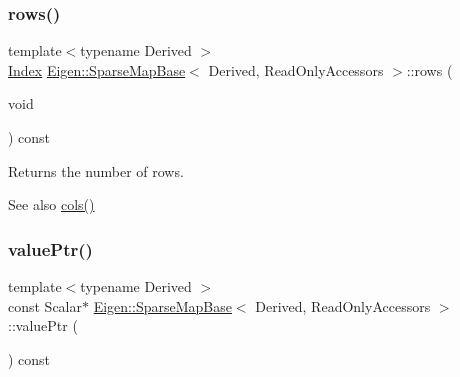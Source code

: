 \subsubsection{\texorpdfstring{rows()}{rows()}}
{\footnotesize\ttfamily template$<$typename Derived $>$ \\
\mbox{\hyperlink{struct_eigen_1_1_eigen_base_a554f30542cc2316add4b1ea0a492ff02}{Index}} \mbox{\hyperlink{class_eigen_1_1_sparse_map_base}{Eigen\+::\+Sparse\+Map\+Base}}$<$ Derived, Read\+Only\+Accessors $>$\+::rows (\begin{DoxyParamCaption}\item[{void}]{ }\end{DoxyParamCaption}) const\hspace{0.3cm}{\ttfamily [inline]}}





\begin{DoxyReturn}{Returns}
the number of rows. 
\end{DoxyReturn}
\begin{DoxySeeAlso}{See also}
\mbox{\hyperlink{class_eigen_1_1_sparse_map_base_3_01_derived_00_01_read_only_accessors_01_4_a0fc44f3781a869a3a410edd6691fd899}{cols()}} 
\end{DoxySeeAlso}
\mbox{\label{class_eigen_1_1_sparse_map_base_3_01_derived_00_01_read_only_accessors_01_4_a574ea9371c22eabebdda21c0787312dc}} 
\subsubsection{\texorpdfstring{valuePtr()}{valuePtr()}}
{\footnotesize\ttfamily template$<$typename Derived $>$ \\
const Scalar$\ast$ \mbox{\hyperlink{class_eigen_1_1_sparse_map_base}{Eigen\+::\+Sparse\+Map\+Base}}$<$ Derived, Read\+Only\+Accessors $>$\+::value\+Ptr (\begin{DoxyParamCaption}{ }\end{DoxyParamCaption}) const\hspace{0.3cm}{\ttfamily [inline]}}





